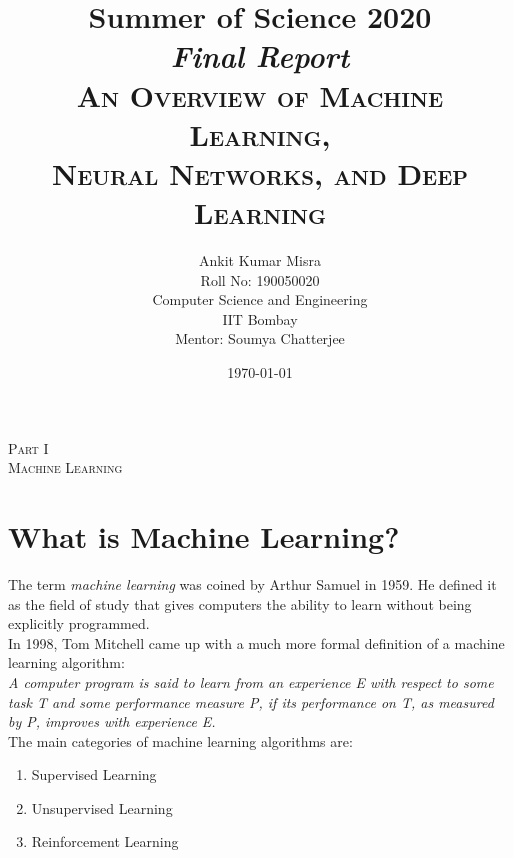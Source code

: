 \documentclass[a4paper, 12pt]{article}
\title{
	{\huge\bf Summer of Science 2020} \\
	[1cm]
	\textit{Final Report} \\
	[2cm]
	{\LARGE\scshape An Overview of Machine Learning,\\Neural Networks, and Deep Learning} \\
	[2cm]
}
\author{
	Ankit Kumar Misra \\
	Roll No: 190050020 \\
	Computer Science and Engineering \\
	IIT Bombay \\
	[2cm]
	Mentor: Soumya Chatterjee \\
	[2cm]
}
\date{\today}
\begin{document}

\maketitle

\newpage

\tableofcontents

\newpage


\vspace*{\fill}
\begin{center}
{\huge\scshape Part I \\\vspace{1cm} Machine Learning}
\end{center}
\vspace*{\fill}

\newpage

\section{What is Machine Learning?}
The term \textit{machine learning} was coined by Arthur Samuel in 1959. He defined it as the field of study that gives computers the ability to learn without being explicitly programmed. \\
\break
In 1998, Tom Mitchell came up with a much more formal definition of a machine learning algorithm: \\
\textit{A computer program is said to learn from an experience E with respect to some task T and some performance measure P, if its performance on T, as measured by P, improves with experience E.} \\
\break
The main categories of machine learning algorithms are:
\begin{enumerate}
\item Supervised Learning
\item Unsupervised Learning
\item Reinforcement Learning
\end{enumerate}
\end{document}
